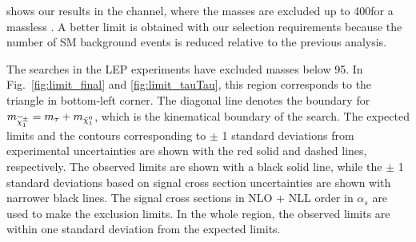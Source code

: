 shows our results in the \tauTau channel, where the \chione masses are excluded up to 400\GeV for a massless \PSGczDo. 
A better limit is obtained with our selection requirements because the number of SM background events is reduced relative to the previous analysis.

The \sTau searches in the LEP experiments \cite{lepsusy} have excluded masses below 95\GeV. In Fig.~\ref{fig:limit_final} and 
\ref{fig:limit_tauTau}, this region corresponds to the triangle in bottom-left corner. 
The diagonal line denotes the boundary for $m_{\widetilde{\chi}^{\pm}_1} = m_{\tau} + m_{\tilde{\chi}^{0}_1}$, which is the kinematical boundary of the search.
The expected limits and the contours corresponding to $\pm$ 1 standard deviations from experimental uncertainties are shown with the red solid and dashed lines, respectively. 
The observed limits are shown with a black solid line, 
while the $\pm$ 1 standard deviations based on signal cross section uncertainties are shown with narrower black lines.
The signal cross sections in NLO + NLL order in $\alpha_s$ are used to make the exclusion limits.
In the whole region, the observed limits are within one standard deviation from the expected limits.  


